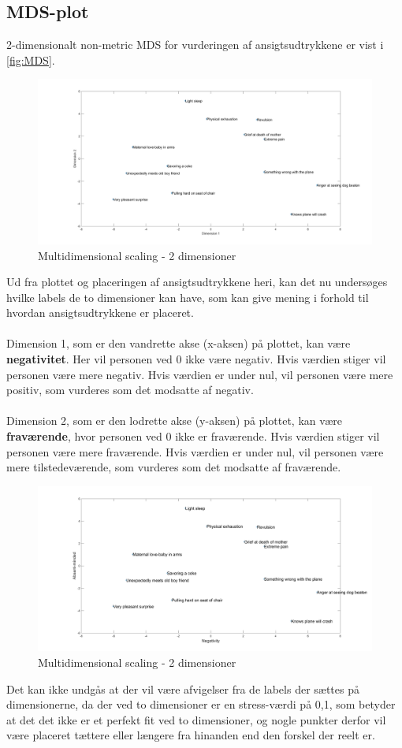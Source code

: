 \subsection*{MDS-plot}
2-dimensionalt non-metric MDS for vurderingen af ansigtsudtrykkene er vist i \autoref{fig:MDS}.  
%
\begin{figure}[H]
\centering
\includegraphics[width =\textwidth]{Figure/MDS_plot} 
\caption{Multidimensional scaling - 2 dimensioner}
\label{fig:MDS}
\end{figure}
%

\noindent Ud fra plottet og placeringen af ansigtsudtrykkene heri, kan det nu undersøges hvilke labels de to dimensioner kan have, som kan give mening i forhold til hvordan ansigtsudtrykkene er placeret. 
\\\\
Dimension 1, som er den vandrette akse (x-aksen) på plottet, kan være \textbf{negativitet}. Her vil personen ved 0 ikke være negativ. Hvis værdien stiger vil personen være mere negativ. Hvis værdien er under nul, vil personen være mere positiv, som vurderes som det modsatte af negativ. 
\\\\
Dimension 2, som er den lodrette akse (y-aksen) på plottet, kan være \textbf{fraværende}, hvor personen ved 0 ikke er fraværende. Hvis værdien stiger vil personen være mere fraværende. Hvis værdien er under nul, vil personen være mere tilstedeværende, som vurderes som det modsatte af fraværende. 
%
\begin{figure}[H]
\centering
\includegraphics[width =\textwidth]{Figure/MDS_plot2} 
\caption{Multidimensional scaling - 2 dimensioner}
\label{fig:MDS}
\end{figure}
\noindent
%
Det kan ikke undgås at der vil være afvigelser fra de labels der sættes på dimensionerne, da der ved to dimensioner er en stress-værdi på 0,1, som betyder at det det ikke er et perfekt fit ved to dimensioner, og nogle punkter derfor vil være placeret tættere eller længere fra hinanden end den forskel der reelt er.